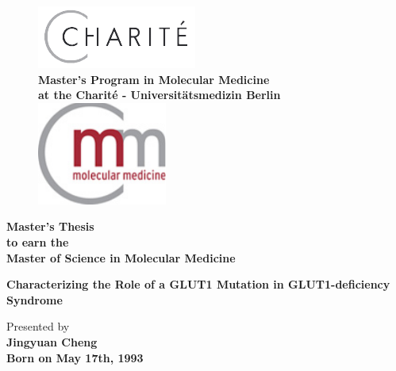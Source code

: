 \documentclass[
12pt, %
english, %
onehalfspacing, %
headsepline, %
]{MastersDoctoralThesis} %
\author{Jingyuan \textsc{Cheng}} %
\begin{document}
\frontmatter %

\pagestyle{plain} %


\begin{titlepage}
\begin{center}

\begin{figure}
\centering
\includegraphics[scale=1.0]{Figures/Charite.pdf}\ \\[2ex]

\Large\bfseries Master's Program in Molecular Medicine\\
\Large at the Charit\'{e} - Universit\"{a}tsmedizin Berlin\\
\vspace*{1cm}
\includegraphics[scale=1.0]{Figures/molmed.pdf}
\label{titlepictures}
\end{figure}

\LARGE\bfseries Master's Thesis\\
\large\normalfont to earn the\\
\LARGE\bfseries Master of Science in Molecular Medicine\\

\vspace*{1cm}

\LARGE\bfseries Characterizing the Role of a GLUT1 Mutation in GLUT1-deficiency Syndrome

\vspace*{1cm}

\large\normalfont Presented by\\
\bfseries Jingyuan Cheng\\
\large\normalfont Born on May 17th, 1993\\


\end{center}
\end{titlepage}
\end{document}
